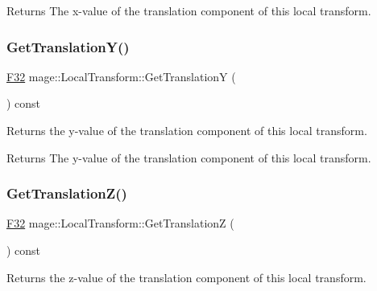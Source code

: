 \begin{DoxyReturn}{Returns}
The x-\/value of the translation component of this local transform. 
\end{DoxyReturn}
\mbox{\label{classmage_1_1_local_transform_a31441b5c6cca77b6f0e8c5cc9c3bf3f0}} 
\subsubsection{\texorpdfstring{Get\+Translation\+Y()}{GetTranslationY()}}
{\footnotesize\ttfamily \mbox{\hyperlink{namespacemage_aa97e833b45f06d60a0a9c4fc22ae02c0}{F32}} mage\+::\+Local\+Transform\+::\+Get\+TranslationY (\begin{DoxyParamCaption}{ }\end{DoxyParamCaption}) const\hspace{0.3cm}{\ttfamily [noexcept]}}

Returns the y-\/value of the translation component of this local transform.

\begin{DoxyReturn}{Returns}
The y-\/value of the translation component of this local transform. 
\end{DoxyReturn}
\mbox{\label{classmage_1_1_local_transform_a09d94a592dab22c23e664402144d75bc}} 
\subsubsection{\texorpdfstring{Get\+Translation\+Z()}{GetTranslationZ()}}
{\footnotesize\ttfamily \mbox{\hyperlink{namespacemage_aa97e833b45f06d60a0a9c4fc22ae02c0}{F32}} mage\+::\+Local\+Transform\+::\+Get\+TranslationZ (\begin{DoxyParamCaption}{ }\end{DoxyParamCaption}) const\hspace{0.3cm}{\ttfamily [noexcept]}}

Returns the z-\/value of the translation component of this local transform.


